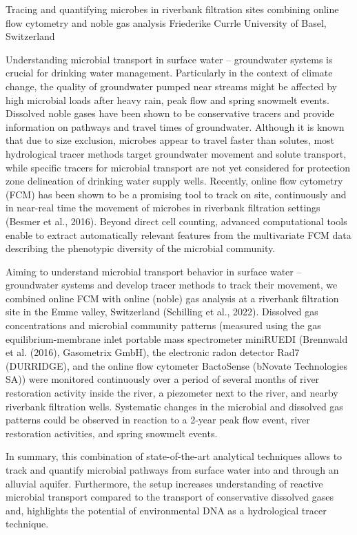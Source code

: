 \begin{conf-abstract}
{Tracing and quantifying microbes in riverbank filtration sites combining online flow cytometry and noble gas analysis}
{Friederike Currle}
{University of Basel, Switzerland}
{Understanding microbial transport in surface water – groundwater systems is crucial for drinking water management. Particularly in the context of climate change, the quality of groundwater pumped near streams might be affected by high microbial loads after heavy rain, peak flow and spring snowmelt events. Dissolved noble gases have been shown to be conservative tracers and provide information on pathways and travel times of groundwater. Although it is known that due to size exclusion, microbes appear to travel faster than solutes, most hydrological tracer methods target groundwater movement and solute transport, while specific tracers for microbial transport are not yet considered for protection zone delineation of drinking water supply wells. Recently, online flow cytometry (FCM) has been shown to be a promising tool to track on site, continuously and in near-real time the movement of microbes in riverbank filtration settings (Besmer et al., 2016). Beyond direct cell counting, advanced computational tools enable to extract automatically relevant features from the multivariate FCM data describing the phenotypic diversity of the microbial community.

Aiming to understand microbial transport behavior in surface water – groundwater systems and develop tracer methods to track their movement, we combined online FCM with online (noble) gas analysis at a riverbank filtration site in the Emme valley, Switzerland (Schilling et al., 2022). Dissolved gas concentrations and microbial community patterns (measured using the gas equilibrium-membrane inlet portable mass spectrometer miniRUEDI (Brennwald et al. (2016), Gasometrix GmbH), the electronic radon detector Rad7 (DURRIDGE), and the online flow cytometer BactoSense (bNovate Technologies SA)) were monitored continuously over a period of several months of river restoration activity inside the river, a piezometer next to the river, and nearby riverbank filtration wells. Systematic changes in the microbial and dissolved gas patterns could be observed in reaction to a 2-year peak flow event, river restoration activities, and spring snowmelt events.

In summary, this combination of state-of-the-art analytical techniques allows to track and quantify microbial pathways from surface water into and through an alluvial aquifer. Furthermore, the setup increases understanding of reactive microbial transport compared to the transport of conservative dissolved gases and, highlights the potential of environmental DNA as a hydrological tracer technique.}
\end{conf-abstract}
